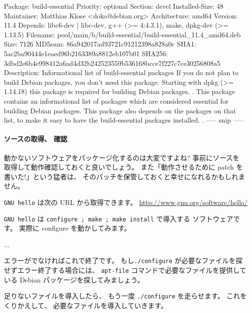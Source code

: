 \documentclass[mingoth,a4paper]{jsarticle}
\begin{document}
\begin{commandline}
Package: build-essential
Priority: optional
Section: devel
Installed-Size: 48
Maintainer: Matthias Klose <doko@debian.org>
Architecture: amd64
Version: 11.4
Depends: libc6-dev | libc-dev, g++ (>= 4:4.3.1), make, dpkg-dev (>= 1.13.5)
Filename: pool/main/b/build-essential/build-essential_11.4_amd64.deb
Size: 7126
MD5sum: 86a942017ad93721c91212398a828a0c
SHA1: 5ac2ba90444e1eaed96b2163389a8812eb107b01
SHA256: 3dbd2e6b4e998412a6ad4d32b242523559b536168bcce7f227c7ce30256808a5
Description: Informational list of build-essential packages
 If you do not plan to build Debian packages, you don't need this
 package.  Starting with dpkg (>= 1.14.18) this package is required
 for building Debian packages.
 .
 This package contains an informational list of packages which are
 considered essential for building Debian packages.  This package also
 depends on the packages on that list, to make it easy to have the
 build-essential packages installed.
 .
----- snip -----
\end{commandline}

\paragraph{ソースの取得、 確認}
動かないソフトウェアをパッケージ化するのは大変ですよね?  事前にソースを
取得して動作確認しておくと良いでしょう。  また「動作させるために patch
を書いた!」という猛者は、 そのパッチを保管しておくと幸せになれるかもしれません。

{\tt GNU hello} は次の URL から取得できます。
\url{http://www.gnu.org/software/hello/}

{\tt GNU hello} は {\tt configure ; make ; make install} で導入する
ソフトウェアです。 実際に configure を動かしてみます。
\begin{commandline}
...
\end{commandline}
エラーがでなければこれで終了です。
もし{\tt ./configure} が必要なファイルを探せずエラー終了する場合には、
{\tt apt-file} コマンドで必要なファイルを提供している
Debian パッケージを探してみましょう。
\begin{commandline}
\end{commandline}
足りないファイルを導入したら、 もう一度 {\tt ./configure} を走らせます。
これをくりかえして、 必要なファイルを導入していきます。
\end{document}
